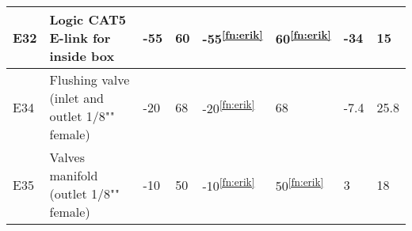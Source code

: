 \begin{longtable}{|m{1cm}|m{3.5cm}|m{1.3cm}|m{1.3cm}|m{1.4cm}|m{1.3cm}|m{1.3cm}|m{1.3cm}|}
E32 & Logic CAT5 E-link for inside box &-55 & 60 & -55\textsuperscript{\ref{fn:erik}} & 60\textsuperscript{\ref{fn:erik}} & -34 & 15 \\ \hline
E34 & Flushing valve (inlet and outlet 1/8"" female) & -20 & 68 & -20\textsuperscript{\ref{fn:erik}} & 68 & -7.4 & 25.8 \\ \hline
E35 & Valves manifold (outlet 1/8"" female) & -10 & 50 & -10\textsuperscript{\ref{fn:erik}} & 50\textsuperscript{\ref{fn:erik}} & 3 & 18 \\ \hline

\end{longtable}
